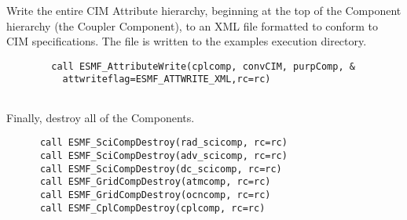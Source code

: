  

  \begin{sloppypar}
       Write the entire CIM Attribute hierarchy, beginning at the top of the
       Component hierarchy (the Coupler Component), to an XML file formatted 
       to conform to CIM specifications.  The file is written to the examples 
       execution directory.
  \end{sloppypar} 

 \begin{verbatim}
        call ESMF_AttributeWrite(cplcomp, convCIM, purpComp, &
          attwriteflag=ESMF_ATTWRITE_XML,rc=rc)
 
\end{verbatim}
 

  \begin{sloppypar}
       Finally, destroy all of the Components.
  \end{sloppypar} 

 \begin{verbatim}
      call ESMF_SciCompDestroy(rad_scicomp, rc=rc)
      call ESMF_SciCompDestroy(adv_scicomp, rc=rc)
      call ESMF_SciCompDestroy(dc_scicomp, rc=rc)
      call ESMF_GridCompDestroy(atmcomp, rc=rc)
      call ESMF_GridCompDestroy(ocncomp, rc=rc)
      call ESMF_CplCompDestroy(cplcomp, rc=rc)
 
\end{verbatim}

\setlength{\parskip}{\oldparskip}
\setlength{\parindent}{\oldparindent}
\setlength{\baselineskip}{\oldbaselineskip}
